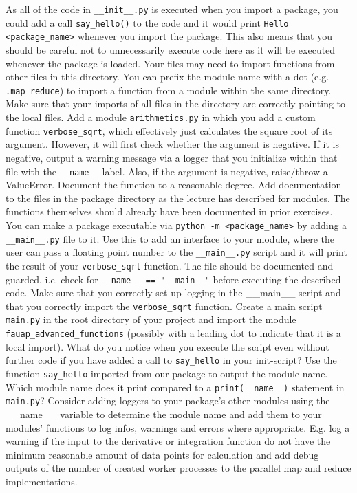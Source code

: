 \documentclass[]{erlangen-problemset}
\begin{document}
\begin{problem}[title={Using files and directories as modules}]
As all of the code in \texttt{\_\_init\_\_.py} is executed when you import a package, you could add a call  \texttt{say\_hello()} to the code and it would print \texttt{Hello <package\_name>} whenever you import the package. 
This also means that you should be careful not to unnecessarily execute code here as it will be executed whenever the package is loaded.
\Question Your files may need to import functions from other files in this directory. You can prefix the module name with a dot (e.g. \texttt{.map\_reduce}) to import a function from a module within the same directory. 
Make sure that your imports of all files in the directory are correctly pointing to the local files.
\Question Add a module \texttt{arithmetics.py} in which you add a custom function \texttt{verbose\_sqrt}, which effectively just calculates the square root of its argument. 
However, it will first check whether the argument is negative. 
If it is negative, output a warning message via a logger that you initialize within that file with the \texttt{\_\_name\_\_} label. 
Also, if the argument is negative, raise/throw a ValueError.
Document the function to a reasonable degree.
\Question Add documentation to the files in the package directory as the lecture has described for modules. 
The functions themselves should already have been documented in prior exercises.
\Question You can make a package executable via \texttt{python -m <package\_name>} by adding a \texttt{\_\_main\_\_.py} file to it. 
Use this to add an interface to your module, where the user can pass a floating point number to the \texttt{\_\_main\_\_.py} script and it will print the result of your \texttt{verbose\_sqrt} function. 
The file should be documented and guarded, i.e. check for \texttt{\_\_name\_\_ == "\_\_main\_\_"} before executing the described code. 
Make sure that you correctly set up logging in the \_\_main\_\_ script and that you correctly import the \texttt{verbose\_sqrt} function. 
\Question Create a main script \texttt{main.py} in the root directory of your project and import the module \texttt{fauap\_advanced\_functions} (possibly with a leading dot to indicate that it is a local import).
What do you notice when you execute the script even without further code if you have added a call to \texttt{say\_hello} in your init-script? 
\Question Use the function \texttt{say\_hello} imported from our package to output the module name.
 Which module name does it print compared to a \texttt{print(\_\_name\_\_)} statement in \texttt{main.py}?
\Question Consider adding loggers to your package's other modules using the \_\_name\_\_ variable to determine the module name and add them to your modules' functions to log infos, warnings and errors where appropriate. 
E.g. log a warning if the input to the derivative or integration function do not have the minimum reasonable amount of data points for calculation and add debug outputs of the number of created worker processes to the parallel map and reduce implementations.
\end{problem}
\end{document}
